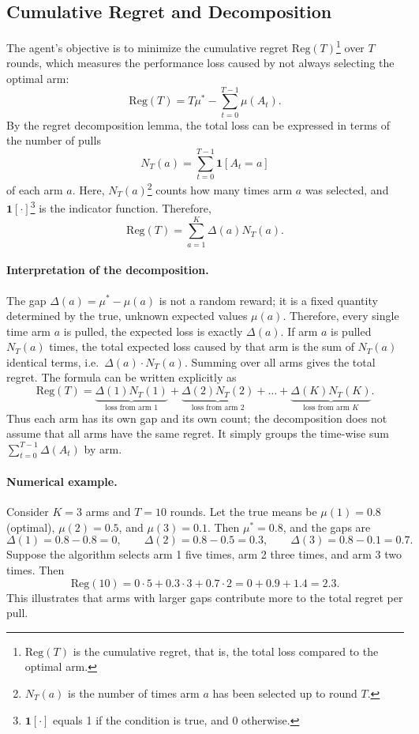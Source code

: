 \subsection{Cumulative Regret and Decomposition}
The agent's objective is to minimize the cumulative regret \(\mathrm{Reg}(T)\)\footnote{\(\mathrm{Reg}(T)\) is the cumulative regret, that is, the total loss compared to the optimal arm.} over \(T\) rounds, which measures the performance loss caused by not always selecting the optimal arm:
\begin{equation}
    \mathrm{Reg}(T) = T \mu^* - \sum_{t=0}^{T-1} \mu(A_t).
\end{equation}
By the regret decomposition lemma, the total loss can be expressed in terms of the number of pulls
\[
N_T(a) = \sum_{t=0}^{T-1} \mathbf{1}[A_t = a]
\]
of each arm \(a\). Here, \(N_T(a)\)\footnote{\(N_T(a)\) is the number of times arm \(a\) has been selected up to round \(T\).} counts how many times arm \(a\) was selected, and \(\mathbf{1}[\cdot]\)\footnote{\(\mathbf{1}[\cdot]\) equals 1 if the condition is true, and 0 otherwise.} is the indicator function. Therefore,
\begin{equation}
    \mathrm{Reg}(T) = \sum_{a=1}^K \Delta(a) N_T(a).
\end{equation}

\paragraph{Interpretation of the decomposition.} The gap \(\Delta(a) = \mu^* - \mu(a)\) is not a random reward; it is a fixed quantity determined by the true, unknown expected values \(\mu(a)\). Therefore, every single time arm \(a\) is pulled, the expected loss is exactly \(\Delta(a)\). If arm \(a\) is pulled \(N_T(a)\) times, the total expected loss caused by that arm is the sum of \(N_T(a)\) identical terms, i.e.\ \(\Delta(a) \cdot N_T(a)\). Summing over all arms gives the total regret. The formula can be written explicitly as
\[
\mathrm{Reg}(T) = \underbrace{\Delta(1) N_T(1)}_{\text{loss from arm 1}} + \underbrace{\Delta(2) N_T(2)}_{\text{loss from arm 2}} + \dots + \underbrace{\Delta(K) N_T(K)}_{\text{loss from arm } K}.
\]
Thus each arm has its own gap and its own count; the decomposition does not assume that all arms have the same regret. It simply groups the time-wise sum \(\sum_{t=0}^{T-1} \Delta(A_t)\) by arm.

\paragraph{Numerical example.} Consider \(K=3\) arms and \(T=10\) rounds. Let the true means be \(\mu(1)=0.8\) (optimal), \(\mu(2)=0.5\), and \(\mu(3)=0.1\). Then \(\mu^*=0.8\), and the gaps are
\[
\Delta(1) = 0.8-0.8 = 0,\qquad
\Delta(2) = 0.8-0.5 = 0.3,\qquad
\Delta(3) = 0.8-0.1 = 0.7.
\]
Suppose the algorithm selects arm 1 five times, arm 2 three times, and arm 3 two times. Then
\[
\mathrm{Reg}(10) = 0\cdot 5 + 0.3\cdot 3 + 0.7\cdot 2 = 0 + 0.9 + 1.4 = 2.3.
\]
This illustrates that arms with larger gaps contribute more to the total regret per pull.

